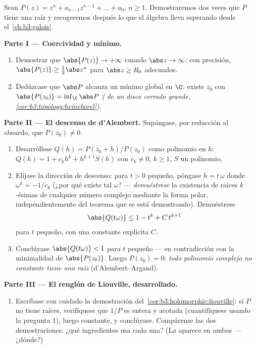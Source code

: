 \begin{problem}\label{pb:b3:holomorphic:1} Sean
$P(z) = z^n + a_{n-1}z^{n-1} + \dots + a_0$, $n \geq 1$. Demostraremos
dos veces que $P$ tiene una raíz y recogeremos después lo que el álgebra
lleva esperando desde el~\cref{ch:b3:galois}.

\medskip
\noindent\textbf{Parte I --- Coercividad y mínimo.}
\begin{enumerate}
  \item Demostrar que $\abs{P(z)} \to +\infty$ cuando $\abs z \to
        \infty$: con precisión, $\abs{P(z)} \geq \frac12\abs z^n$ para
  $\abs z \geq R_0$ adecuados. \item Dedúzcase que $\abs P$ alcanza un
  mínimo global en $\C$: existe $z_0$ con $\abs{P(z_0)} = \inf_\C\abs P$
  \emph{( de un disco cerrado grande,
        \cref{cor:b3:topology:heineborel})}.
\end{enumerate}

\medskip
\noindent\textbf{Parte II --- El descenso de d'Alembert.} Supóngase, por
reducción al absurdo, que $P(z_0) \neq 0$.
\begin{enumerate}[resume]
  \item Desarróllese $Q(h) = P(z_0 + h)/P(z_0)$ como polinomio en $h$:
  $Q(h) = 1 + c_kh^k + h^{k+1}S(h)$ con $c_k \neq
        0$, $k \geq 1$, $S$ un polinomio. \item Elíjase la dirección de
  descenso: para $t > 0$ pequeño, póngase $h = t\,\omega$ donde
  $\omega^k = -1/c_k$ (¿por qué existe tal $\omega$? ---
  \emph{demuéstrese} la existencia de raíces $k$-ésimas de cualquier
  número complejo mediante la forma polar, independientemente del
  teorema que se está demostrando). Demuéstrese
        \[
        \abs{Q(t\omega)} \leq 1 - t^k + C\,t^{k+1}
        \]
        para $t$ pequeño, con una constante explícita $C$. \item
        Conclúyase $\abs{Q(t\omega)} < 1$ para $t$ pequeño --- en
        contradicción con la minimalidad de $\abs{P(z_0)}$. Luego
        $P(z_0) = 0$: \emph{todo polinomio complejo no constante tiene
        una raíz} (d'Alembert--Argand).
\end{enumerate}

\medskip
\noindent\textbf{Parte III --- El renglón de Liouville, desarrollado.}
\begin{enumerate}[resume]
  \item Escríbase con cuidado la demostración
  del~\cref{cor:b3:holomorphic:liouville}: si $P$ no tiene raíces,
  verifíquese que $1/P$ es entera y acotada (cuantifíquese usando la
  pregunta 1), luego constante, y conclúyase. Compárense las dos
  demostraciones: ¿qué ingredientes usa cada una? (La  aparece
  en ambas --- ¿dónde?)
\end{enumerate}


\end{problem}
